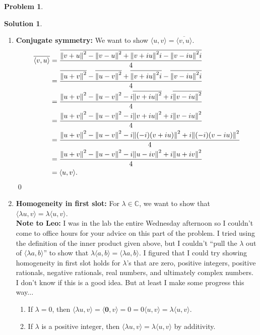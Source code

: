 \documentclass{article}
\theoremstyle{definition}
\newtheorem*{prob*}{Problem}
\newtheorem*{sln*}{Solution}
\newcommand{\la}{\langle}
\newcommand{\ra}{\rangle}
\begin{document}
\begin{prob*}
\begin{enumerate}
\begin{sln*}
\begin{enumerate}
				\item \textbf{Conjugate symmetry:} We want to show $\la u,v \ra = \overline{\la v,u \ra}$. 
				\begin{align*}
				\overline{\la v,u \ra} 
				&= \frac{\overline{\norm{v+u}^2  - \norm{v-u}^2 + \norm{v + iu}^2i - \norm{v - iu}^2i  } }{4}\\
				&= \frac{\overline{\norm{u+ v}^2}  - \overline{\norm{u-v}^2} + \overline{\norm{v + iu}^2i} - \overline{\norm{v - iu}^2i  } }{4} \\
				&= \frac{{\norm{u+ v}^2}  - {\norm{u-v}^2} - i\overline{\norm{v + iu}^2} + i\overline{\norm{v - iu}^2  } }{4}\\
				&= \frac{{\norm{u+ v}^2}  - {\norm{u-v}^2} - i{\norm{v + iu}^2} + i{\norm{v - iu}^2  } }{4}\\
				&= \frac{{\norm{u+ v}^2}  - {\norm{u-v}^2} - i{\norm{(-i)(v + iu)}^2} + i{\norm{(-i)(v - iu)}^2 } }{4}\\
				&= \frac{{\norm{u+ v}^2}  - {\norm{u-v}^2} - i{\norm{u -iv}^2} + i{\norm{u + iv}^2 } }{4}\\
				&= \la u,v \ra.
				\end{align*}\qed
				
				
				\item \textbf{Homogeneity in first slot:} For $\lambda \in \mathbb{C}$, we want to show that $\la \lambda u,v\ra = \lambda \la u , v \ra$. \\
				
				\textbf{Note to Leo:} I was in the lab the entire Wednesday afternoon so I couldn't come to office hours for your advice on this part of the problem. I tried using the definition of the inner product given above, but I couldn't ``pull the $\lambda$ out of $\la \lambda a ,b\ra$'' to show that $\lambda \la a,b \ra = \la \lambda a , b\ra$. I figured that I could try showing homogeneity in first slot holds for $\lambda$'s that are zero, positive integers, positive rationals, negative rationals, real numbers, and ultimately complex numbers. I don't know if this is a good idea. But at least I make some progress this way...
				
				\begin{enumerate}
					\item If $\lambda = 0$, then $\la \lambda u ,v \ra = \la \mathbf{0},v\ra = 0 =  0\la u,v \ra = \lambda\la u,v \ra$.
					
					\item If $\lambda$ is a positive integer, then 
					$\la \lambda u,v \ra = \lambda\la u,v \ra$
					by additivity.
					

\end{enumerate}
\end{enumerate}
\end{sln*}
\end{enumerate}
\end{prob*}
\end{document}
